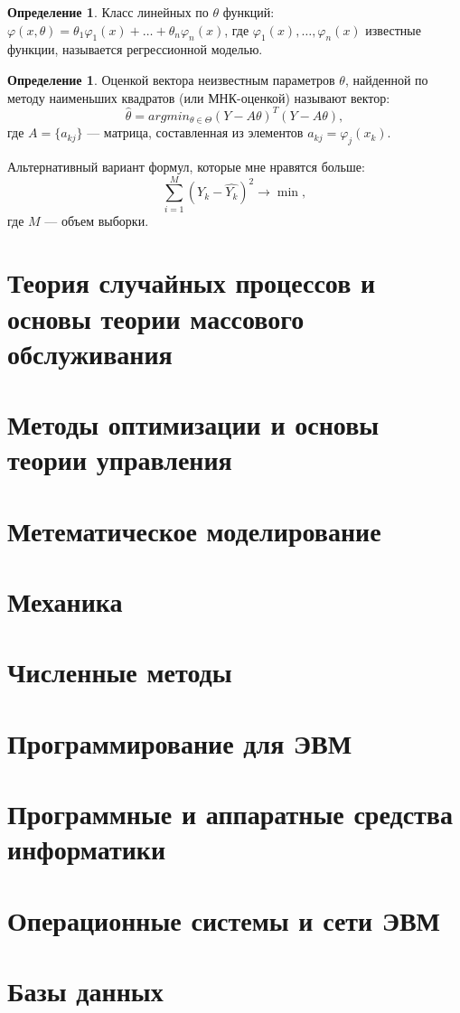 \documentclass[12pt]{report}
\theoremstyle{definition}
\newtheorem{definition}[theorem]{Определение}
\begin{document}
\begin{definition}
Класс линейных по $\theta$ функций:
$\varphi(x, \theta) = \theta_1 \varphi_1(x) + \dots + \theta_n \varphi_n(x)$,
где $\varphi_1(x), \dots, \varphi_n(x)$ известные функции, называется регрессионной моделью.
\end{definition}

\begin{definition}
Оценкой вектора неизвестным параметров $\theta$, найденной по методу
наименьших квадратов (или МНК-оценкой) называют вектор:
$$
\hat{\theta} = argmin_{\theta \in \Theta} (Y - A \theta)^T (Y - A \theta),
$$ где $A = \{a_{kj}\}$ --- матрица, составленная из элементов
$a_{kj} = \varphi_j(x_k)$.
\end{definition}

Альтернативный вариант формул, которые мне нравятся больше:
$$
\sum\limits_{i = 1}^{M} (Y_k - \hat{Y_k})^2 \rightarrow \min,
$$
где $M$ --- объем выборки.


\chapter{Теория случайных процессов и основы теории массового обслуживания}

\chapter{Методы оптимизации и основы теории управления}

\chapter{Метематическое моделирование}

\chapter{Механика}

\chapter{Численные методы}

\chapter{Программирование для ЭВМ}

\chapter{Программные и аппаратные средства информатики}

\chapter{Операционные системы и сети ЭВМ}

\chapter{Базы данных}
\end{document}
